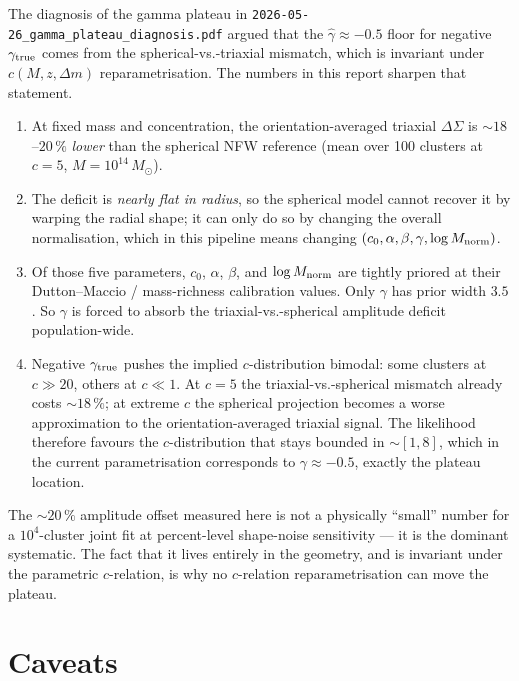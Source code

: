 \documentclass[11pt,a4paper]{article}
\newcommand{\DS}{\Delta\Sigma}
\newcommand{\Msun}{\,M_{\odot}}
\newcommand{\gtrue}{\gamma_{\rm true}}
\begin{document}
The diagnosis of the gamma plateau in
\texttt{2026-05-26\_gamma\_plateau\_diagnosis.pdf} argued that the
$\hat\gamma\approx -0.5$ floor for negative $\gamma_{\rm true}$ comes from
the spherical-vs.-triaxial mismatch, which is invariant under $c(M,z,\Delta
m)$ reparametrisation.  The numbers in this report sharpen that statement.

\begin{enumerate}
\item At fixed mass and concentration, the orientation-averaged triaxial
      $\DS$ is $\sim 18$--$20\,\%$ \emph{lower} than the spherical NFW
      reference (mean over 100 clusters at $c=5$, $M=10^{14}\Msun$).
\item The deficit is \emph{nearly flat in radius}, so the spherical model
      cannot recover it by warping the radial shape; it can only do so by
      changing the overall normalisation, which in this pipeline means
      changing $(c_0,\alpha,\beta,\gamma,\log M_{\rm norm})$.
\item Of those five parameters, $c_0$, $\alpha$, $\beta$, and
      $\log M_{\rm norm}$ are tightly priored at their Dutton--Maccio
      / mass-richness calibration values.  Only $\gamma$ has prior width
      $3.5$.  So $\gamma$ is forced to absorb the
      triaxial-vs.-spherical amplitude deficit population-wide.
\item Negative $\gtrue$ pushes the implied $c$-distribution bimodal: some
      clusters at $c\!\gg\!20$, others at $c\!\ll\!1$.  At $c=5$ the
      triaxial-vs.-spherical mismatch already costs $\sim 18\,\%$; at
      extreme $c$ the spherical projection becomes a worse approximation
      to the orientation-averaged triaxial signal.  The likelihood
      therefore favours the $c$-distribution that stays bounded in
      $\sim[1,8]$, which in the current parametrisation corresponds to
      $\gamma\approx -0.5$, exactly the plateau location.
\end{enumerate}

The $\sim 20\,\%$ amplitude offset measured here is not a physically
``small'' number for a $10^4$-cluster joint fit at percent-level shape-noise
sensitivity --- it is the dominant systematic.  The fact that it lives
entirely in the geometry, and is invariant under the parametric
$c$-relation, is why no $c$-relation reparametrisation can move the
plateau.

\section{Caveats}
\end{document}
